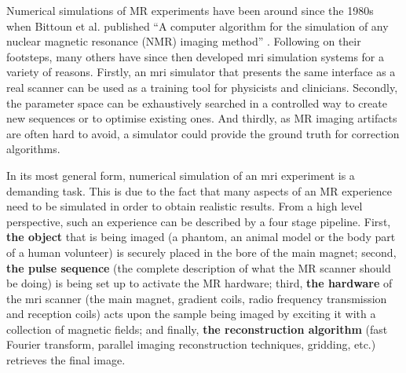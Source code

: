 
Numerical simulations of MR experiments have been around since the 1980s when Bittoun et al. published ``A computer algorithm for the simulation of any nuclear magnetic resonance (NMR) imaging method'' \cite{Bittoun1984}.
Following on their footsteps, many others have since then developed \ac{mri} simulation systems for a variety of reasons.
Firstly, an \ac{mri} simulator that presents the same interface as a real scanner can be used as a training tool for physicists and clinicians.
Secondly, the parameter space can be exhaustively searched in a controlled way to create new sequences or to optimise existing ones.
And thirdly, as MR imaging artifacts are often hard to avoid, a simulator could provide the ground truth for correction algorithms.

\hfill

In its most general form, numerical simulation of an \ac{mri} experiment is a demanding task. 
This is due to the fact that many aspects of an MR experience need to be simulated in order to obtain realistic results.
From a high level perspective, such an experience can be described by a four stage pipeline.
First, \textbf{the object} that is being imaged (a phantom, an animal model or the body part of a human volunteer) is securely placed in the bore of the main magnet; second, \textbf{the pulse sequence} (the complete description of what the MR scanner should be doing) is being set up to activate the MR hardware; third, \textbf{the hardware} of the \ac{mri} scanner (the main magnet, gradient coils, radio frequency transmission and reception coils) acts upon the sample being imaged by exciting it with a collection of magnetic fields; and finally, \textbf{the reconstruction algorithm} (fast Fourier transform, parallel imaging reconstruction techniques, gridding, etc.) retrieves the final image.

\hfill

